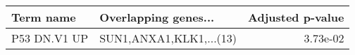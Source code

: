 \begin{tabular}{llr}
\toprule
   Term name &    Overlapping genes... &  Adjusted p-value \\
\midrule
P53 DN.V1 UP & SUN1,ANXA1,KLK1,...(13) &          3.73e-02 \\
\bottomrule
\end{tabular}
